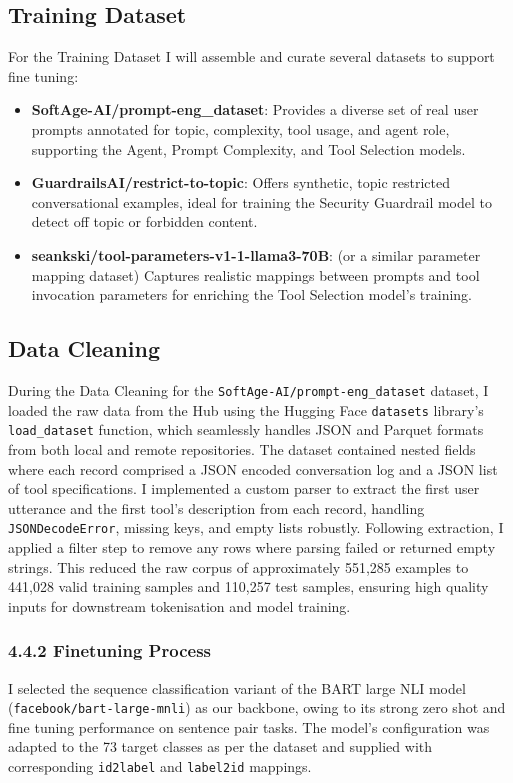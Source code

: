 \subsection{Training Dataset}
\label{training dataset}

For the Training Dataset I will assemble and curate several datasets to support fine tuning:
\begin{itemize}
    \item \textbf{SoftAge-AI/prompt-eng\_dataset}: Provides a diverse set of real user prompts annotated for topic, complexity, tool usage, and agent role, supporting the Agent, Prompt Complexity, and Tool Selection models.
    \item \textbf{GuardrailsAI/restrict-to-topic}: Offers synthetic, topic restricted conversational examples, ideal for training the Security Guardrail model to detect off topic or forbidden content.
    \item \textbf{seankski/tool-parameters-v1-1-llama3-70B}: (or a similar parameter mapping dataset) Captures realistic mappings between prompts and tool invocation parameters for enriching the Tool Selection model's training.
\end{itemize}

\subsection{Data Cleaning}
During the Data Cleaning for the \texttt{SoftAge-AI/prompt-eng\_dataset} dataset, I loaded the raw data from the Hub using the Hugging Face \texttt{datasets} library's \texttt{load\_dataset} function, which seamlessly handles JSON and Parquet formats from both local and remote repositories. The dataset contained nested fields where each record comprised a JSON encoded conversation log and a JSON list of tool specifications. I implemented a custom parser to extract the first user utterance and the first tool's description from each record, handling \texttt{JSONDecodeError}, missing keys, and empty lists robustly. Following extraction, I applied a filter step to remove any rows where parsing failed or returned empty strings. This reduced the raw corpus of approximately 551,285 examples to 441,028 valid training samples and 110,257 test samples, ensuring high quality inputs for downstream tokenisation and model training.



\subsubsection{4.4.2 Finetuning Process}
I selected the sequence classification variant of the BART large NLI model (\texttt{facebook/bart-large-mnli}) as our backbone, owing to its strong zero shot and fine tuning performance on sentence pair tasks. The model's configuration was adapted to the 73 target classes as per the dataset and supplied with corresponding \texttt{id2label} and \texttt{label2id} mappings.


